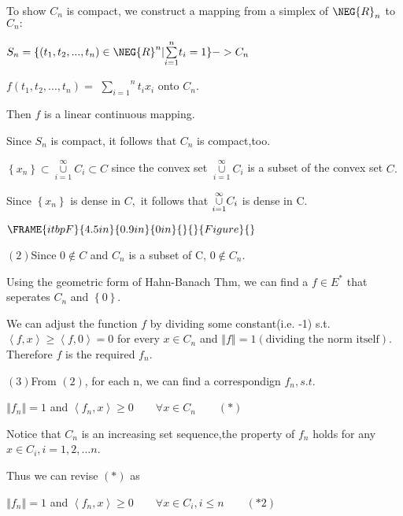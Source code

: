 \documentclass{article}
\begin{document}
To show $C_{n}$ is compact, we construct a mapping from a simplex of $\NEG%
{R}_{n}$ to $C_{n}:$

$S_{n}=\{\left( t_{1},t_{2},...,t_{n}\right) \in \NEG{R}^{n}|\overset{n}{%
\underset{i=1}{\sum }}t_{i}=1\}->C_{n}$

$f\left( t_{1},t_{2},...,t_{n}\right) =$ $\overset{n}{\underset{i=1}{\sum }}%
t_{i}x_{i}$ onto $C_{n}.$

Then $f$ is a linear continuous mapping.

Since $S_{n}$ is compact, it follows that $C_{n}$ is compact,too. 

$\left\{ x_{n}\right\} \subset \underset{i=1}{\overset{\infty }{\cup }}%
C_{i}\subset C$ since the convex set $\underset{i=1}{\overset{\infty }{\cup }%
}C_{i}$ is a subset of the convex set $C.$

Since $\left\{ x_{n}\right\} $ is dense in $C,$ it follows that $\underset{%
i=1}{\overset{\infty }{\cup }}C_{i}$ is dense in C.

$\FRAME{itbpF}{4.5in}{0.9in}{0in}{}{}{Figure}{\special{language "Scientific
Word";type "GRAPHIC";maintain-aspect-ratio TRUE;display "USEDEF";valid_file
"T";width 4.5in;height 0.9in;depth 0in;original-width
7.9321in;original-height 1.2496in;cropleft "0";croptop "1";cropright
"1";cropbottom "0";tempfilename 'NVOLAN01.wmf';tempfile-properties "XPR";}}$

$\left( 2\right) $Since $0\notin C$ and $C_{n}$ is a subset of C, 0$\notin
C_{n}.$

Using the geometric form of Hahn-Banach Thm, we can find a $f\in E^{\ast }$
that seperates $C_{n}$ and $\left\{ 0\right\} .$

We can adjust the function $f$ by dividing some constant(i.e. -1) s.t. $%
\left\langle f,x\right\rangle \geq \left\langle f,0\right\rangle =0$ for
every $x\in C_{n}$ and $\left\Vert f\right\Vert =1\left( \text{dividing the
norm itself}\right) .$Therefore $f$ is the required $f_{n}.$

$\left( 3\right) $From $\left( 2\right) $, for each n, we can find a
correspondign $f_{n},s.t.$

$\left\Vert f_{n}\right\Vert =1$ and $\left\langle f_{n},x\right\rangle \geq
0\qquad \forall x\in C_{n}\qquad \left( \ast \right) $

Notice that $C_{n}$ is an increasing set sequence,the property of $f_{n}$
holds for any $x\in C_{i},i=1,2,...n$. 

Thus we can revise $\left( \ast \right) $ as

$\left\Vert f_{n}\right\Vert =1$ and $\left\langle f_{n},x\right\rangle \geq
0\qquad \forall x\in C_{i},i\leq n\qquad \left( \ast 2\right) $
\end{document}

